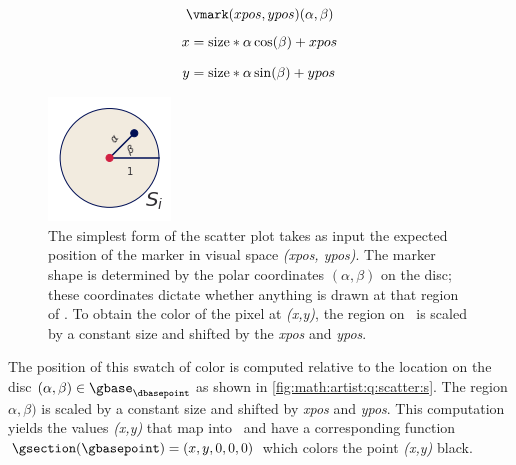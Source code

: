 \documentclass[../main.tex]{subfiles}
\begin{document}
\begin{figure} [H]

\begin{minipage}{.49\textwidth}
    \begingroup \leqnomode
    \begin{equation}
        \vmark(xpos, ypos)(\alpha, \beta)
        \label{eq:eq:math:artist:q:scatter}
    \end{equation}
    \endgroup
    \begin{align*}
        x &= \text{size} *\alpha \cos(\beta) + xpos \\[.5\baselineskip]
        y &= \text{size} *\alpha \sin(\beta) + ypos
    \end{align*}
\end{minipage}
\begin{minipage}{.49\textwidth}
    \centering
    \includegraphics{figures/math/scatter_s.png}
\end{minipage}
\caption{The simplest form of the scatter plot takes as input the expected position of the marker in visual space \textit{(xpos, ypos)}. The marker shape is determined by the polar coordinates $(\alpha, \beta)$ on the disc; these coordinates dictate whether anything is drawn at that region of \gbase. To obtain the color of the pixel at \textit{(x,y)}, the region on \gbase\ is scaled by a constant size and shifted by the \textit{xpos} and \textit{ypos}.}
\label{fig:math:artist:q:scatter:s}
\end{figure}
The position of this swatch of color is computed relative to the location on the disc \((\alpha, \beta) \in \gbase_{\dbasepoint}\) as shown in \autoref{fig:math:artist:q:scatter:s}. The region $\alpha, \beta)$ is scaled by a constant size and shifted by \textit{xpos} and \textit{ypos}. This computation yields the values \textit{(x,y)} that map into \gfiber\ and have a corresponding function $\gsection(\gbasepoint) = (x, y, 0, 0, 0)$ which colors the point \textit{(x,y)} black. 
\end{document}
